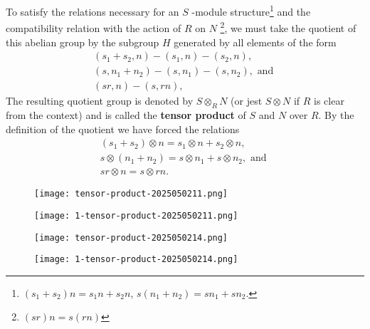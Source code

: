 To satisfy the relations necessary for an $S$ -module structure\footnote{$(s_1+s_2) n=s_1 n+s_2 n$, $s(n_1+n_2)=sn_1+sn_2$.} and the compatibility relation with the action of $R$ on $N$ \footnote{$(sr) n=s (rn)$}, we must take the quotient of this abelian group by the subgroup $H$ generated by all elements of the form
\[
\begin{gathered}
\left(s_1+s_2, n\right)-\left(s_1, n\right)-\left(s_2, n\right), \\
\left(s, n_1+n_2\right)-\left(s, n_1\right)-\left(s, n_2\right), \text { and } \\
(s r, n)-(s, r n),
\end{gathered}
\]
The resulting quotient group is denoted by $S\otimes_{R}N$ (or jest $S\otimes N$ if $R$ is clear from the context) and is called the \textbf{tensor product} of $S$ and $N$ over $R$. By the definition of the quotient we have forced the relations
\[
\begin{gathered}
\left(s_1+s_2\right) \otimes n=s_1 \otimes n+s_2 \otimes n, \\
s \otimes\left(n_1+n_2\right)=s \otimes n_1+s \otimes n_2, \text { and } \\
s r \otimes n=s \otimes r n .
\end{gathered}
\]
\begin{definition}
\begin{figure}[H]
\centering
\texttt{[image: tensor-product-2025050211.png]}
\label{}
\end{figure}
\end{definition}
\begin{example}
\begin{figure}[H]
\centering
\texttt{[image: 1-tensor-product-2025050211.png]}
\label{}
\end{figure}
\end{example}
\begin{definition}[$R$ -balanced]
\begin{figure}[H]
\centering
\texttt{[image: tensor-product-2025050214.png]}
\label{}
\end{figure}
\end{definition}
\begin{definition}[$R$ -bilinear]
\begin{figure}[H]
\centering
\texttt{[image: 1-tensor-product-2025050214.png]}
\label{}
\end{figure}
\end{definition}
